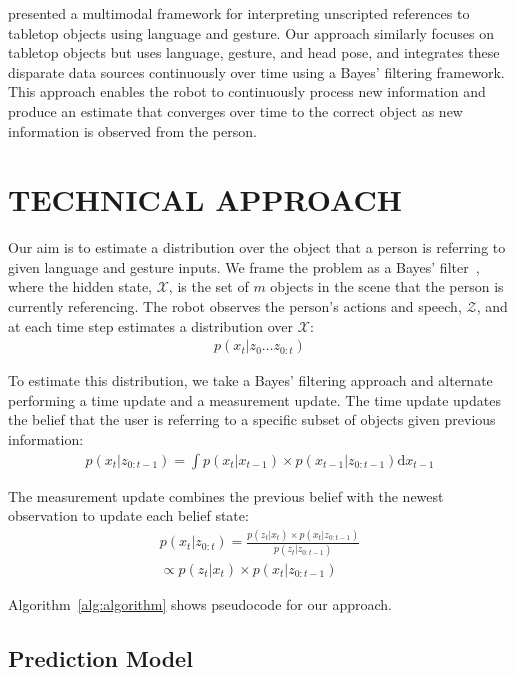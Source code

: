 \documentclass[letterpaper, 10 pt, conference]{ieeeconf}
\begin{document}
\citet{matuszek14} presented a multimodal framework for interpreting
unscripted references to tabletop objects using language and gesture.
Our approach similarly focuses on tabletop objects but uses language,
gesture, and head pose, and integrates these disparate data sources
continuously over time using a Bayes' filtering framework.  This
approach enables the robot to continuously process new information and
produce an estimate that converges over time to the correct object as
new information is observed from the person.  

\section{TECHNICAL APPROACH}

Our aim is to estimate a distribution over the object that a person is
referring to given language and gesture inputs.  We frame the problem
as a Bayes' filter~\citep{thrun08}, where the hidden state,
$\mathcal{X}$, is the set of $m$ objects in the scene that the person
is currently referencing. The robot observes the person's actions and
speech, $\mathcal{Z}$, and at each time step estimates a distribution
over $\mathcal{X}$:
\begin{align}
  p(x_t | z_0 \dots z_{0:t})
\end{align}


To estimate this distribution, we take a Bayes' filtering approach and
alternate performing a time update and a measurement update.  The time
update updates the belief that the user is referring to a specific
subset of objects given previous information:
\begin{align}
p(x_t | z_{0:t-1}) = \int p(x_t|x_{t-1})\times p(x_{t-1} | z_{0:t-1}) \text{d}x_{t-1}
\end{align}

The measurement update combines the previous belief with the newest observation to update each belief state: 
\begin{align}
p(x_t |z_{0:t}) = \frac{p(z_t | x_t) \times p(x_t | z_{0:t-1})}{p(z_t | z_{0:t-1})} \\\propto p(z_t | x_t) \times p(x_t | z_{0:t-1})
\end{align}

Algorithm~\ref{alg:algorithm} shows pseudocode for our approach.


\subsection{Prediction Model}
\end{document}
